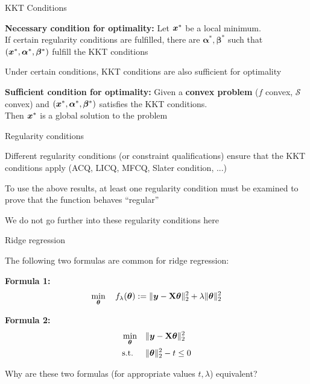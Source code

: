 \documentclass[11pt,compress,t,notes=noshow, xcolor=table]{beamer}
\begin{document}
\begin{framei}{KKT Conditions}
\item \textbf{Necessary condition for optimality:}
Let $\bm{x}^*$ be a local minimum.\\
If certain regularity conditions are fulfilled, there are $\bm{\alpha}^*, \bm{\beta}^*$ such that $(\bm{x}^*, \bm{\alpha}^*, \bm{\beta}^*)$ fulfill the KKT conditions
\vfill
\item Under certain conditions, KKT conditions are also sufficient for optimality
\vfill
\item \textbf{Sufficient condition for optimality:}
Given a \textbf{convex problem} ($f$ convex, $\mathcal{S}$ convex) and $(\bm{x}^*, \bm{\alpha}^*, \bm{\beta}^*)$ satisfies the KKT conditions.\\
Then $\bm{x}^*$ is a global solution to the problem
\end{framei}

\begin{framei}{Regularity conditions}
\item Different regularity conditions (or constraint qualifications) ensure that the KKT conditions apply (ACQ, LICQ, MFCQ, Slater condition, ...)
\item To use the above results, at least one regularity condition must be examined to prove that the function behaves ``regular''
\item We do not go further into these regularity conditions here
\end{framei}

\begin{framei}{Ridge regression}
\item The following two formulas are common for ridge regression:
\item[] \textbf{Formula 1:}
\begin{equation}
\min_{\bm{\theta}} \quad f_\lambda(\bm{\theta}) := \|\bm{y} - \mathbf{X}\bm{\theta}\|_2^2 + \lambda \|\bm{\theta}\|_2^2
\label{eq:form1}
\end{equation}
\item[] \textbf{Formula 2:}
\begin{equation}
\begin{aligned}
\min_{\bm{\theta}} & \quad \|\bm{y} - \mathbf{X}\bm{\theta}\|_2^2 \\
\text{s.t. } & \quad \|\bm{\theta}\|_2^2 - t \le 0
\end{aligned}
\label{eq:form2}
\end{equation}
\item Why are these two formulas (for appropriate values $t, \lambda$) equivalent?
\end{framei}
\end{document}
